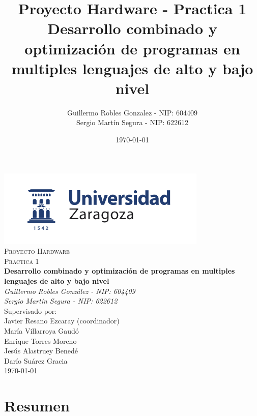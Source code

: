 \documentclass[12pt,letterpaper]{article}
\title{Proyecto Hardware - Practica 1\\Desarrollo combinado y optimizaci\'on de programas en multiples lenguajes de alto y bajo nivel}
\author{Guillermo Robles Gonzalez - NIP: 604409\\Sergio Mart\'in Segura - NIP: 622612}
\date{\today}
\begin{document}
\begin{titlepage}
  \centering
  \includegraphics[width=0.75\textwidth]{logoUZ.png}\\
  \vspace{0.5cm}
  {\scshape\Large Proyecto Hardware\\Practica 1\\}
  \vspace{1.5cm}
  {\huge\bfseries Desarrollo combinado y optimizaci\'on de programas en
    multiples lenguajes de alto y bajo nivel\\}
  \vspace{2cm}
  {\Large \textit{Guillermo Robles Gonz\'alez - NIP: 604409}\\}
  {\Large \textit{Sergio Mart\'in Segura - NIP: 622612}\\}
  \vfill
  Supervisado por:\\
  Javier Resano Ezcaray (coordinador)\\
  Mar\'ia Villarroya Gaud\'o\\
  Enrique Torres Moreno\\
  Jes\'us Alastruey Bened\'e\\
  Dar\'io Su\'arez Gracia\\
  \vfill
  {\large \today}
\end{titlepage}
\tableofcontents
\clearpage
\section{Resumen}
\end{document}
